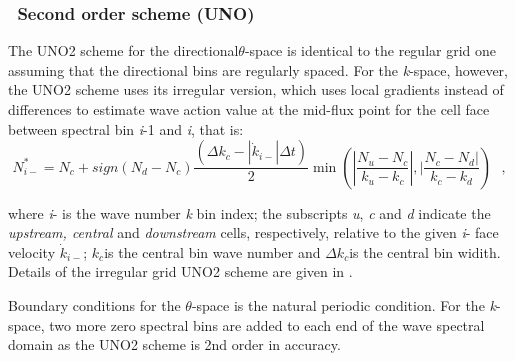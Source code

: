 \vssub
\subsubsection{~Second  order scheme (UNO)}

\noindent
The UNO2 scheme for the directional$\theta$-space is identical to the regular
grid one assuming that the directional bins are regularly spaced. For the
\emph{k}-space, however, the UNO2 scheme uses its irregular version, which
uses local gradients instead of differences to estimate wave action value at
the mid-flux point for the cell face between spectral bin \emph{i}-1 and
\emph{i}, that is:
\begin{equation}
  N_{i-}^{*}=N_{c}+sign\left(N_{d}-N_{c}\right)\frac{\left(\Delta
      k_{c}-|\dot{k}_{i-}|\Delta
      t\right)}{2}\min\left(|\frac{N_{u}-N_{c}}{k_{u}-k_{c}}|,|\frac{N_{c}-N_{d}|}{k_{c}-k_{d}}\right)
  \:\:\: ,
\label{eq:UNO2irregular}
\end{equation}

\noindent
where \emph{i}- is the wave number \emph{k} bin index; the subscripts
\emph{u}, \emph{c} and \emph{d} indicate the \emph{upstream, central} and
\emph{downstream} cells, respectively, relative to the given \emph{i}- face
velocity $\dot{k}_{i-}$; $k_{c}$is the central bin wave number and $\Delta
k_{c}$is the central bin widith. Details of the irregular grid UNO2 scheme are
given in \cite{art:Li08}.

Boundary conditions for the $\theta$-space is the natural periodic
condition. For the \emph{k}-space, two more zero spectral bins are added to
each end of the wave spectral domain as the UNO2 scheme is 2nd order in
accuracy.


